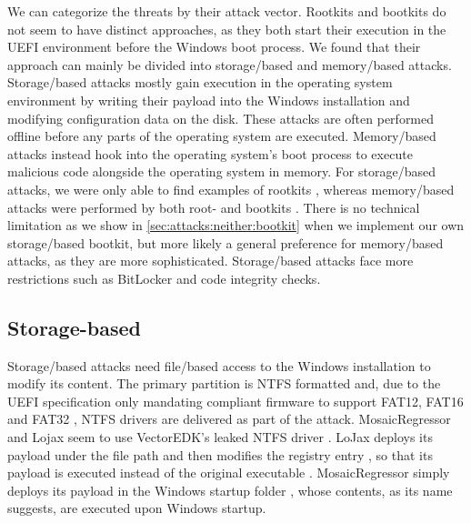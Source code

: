 We can categorize the threats by their attack vector.
Rootkits and bootkits do not seem to have distinct approaches, as they both start their execution in the \ac{UEFI} environment before the Windows boot process.
We found that their approach can mainly be divided into storage\-/based and memory\-/based attacks.
Storage\-/based attacks mostly gain execution in the operating system environment by writing their payload into the Windows installation and modifying configuration data on the disk.
These attacks are often performed offline before any parts of the operating system are executed.
Memory\-/based attacks instead hook into the operating system's boot process to execute malicious code alongside the operating system in memory.
For storage\-/based attacks, we were only able to find examples of rootkits \cite{vector-edk,mosaicregressor-technical-details,lojax}, whereas memory\-/based attacks were performed by both root- and bootkits \cite{dreamboot,efiguard,especter,finspy,moonbounce,cosmicstrand}.
There is no technical limitation as we show in \autoref{sec:attacks:neither:bootkit} when we implement our own storage\-/based bootkit, but more likely a general preference for memory\-/based attacks, as they are more sophisticated.
Storage\-/based attacks face more restrictions such as BitLocker and code integrity checks.

\subsection{Storage-based}

Storage\-/based attacks need file\-/based access to the Windows installation to modify its content.
The primary partition is \ac{NTFS} formatted and, due to the \ac{UEFI} specification only mandating compliant firmware to support \ac{FAT}12, \ac{FAT}16 and \ac{FAT}32 \cite[Section 13.3.1.1]{uefi-spec}, \ac{NTFS} drivers are delivered as part of the attack.
MosaicRegressor and Lojax seem to use VectorEDK's leaked \ac{NTFS} driver \cite{mosaicregressor-technical-details, lojax}.
LoJax deploys its payload under the file path  and then modifies the registry entry , so that its payload is executed instead of the original executable \cite{lojax}.
MosaicRegressor simply deploys its payload in the Windows startup folder \cite{mosaicregressor-technical-details}, whose contents, as its name suggests, are executed upon Windows startup.

